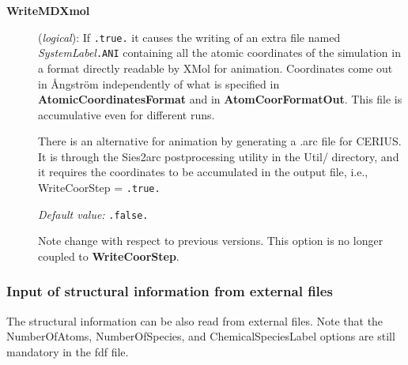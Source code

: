 \documentclass[11pt]{article}
\begin{document}
\begin{itemize}
\begin{description}
\item[{\bf WriteMDXmol}] ({\it logical}):
If {\tt .true.} it causes the writing of an extra file
named {\it SystemLabel}{\tt .ANI} containing all the atomic
coordinates of the simulation in a format directly readable by
{\sc XMol} for animation. Coordinates come out in
{\AA}ngstr\"om independently of what is specified in
{\bf AtomicCoordinatesFormat} and in {\bf AtomCoorFormatOut}.
This file is accumulative even for different runs.

There is an alternative for animation by generating a .arc file for
CERIUS. It is through the {\sc Sies2arc} postprocessing utility in the Util/ directory, and it
requires the coordinates to be accumulated in the output file, i.e.,
WriteCoorStep = {\tt .true.}

{\it Default value:} {\tt .false.}

Note change with respect to previous versions. This option is no
longer coupled to {\bf WriteCoorStep}.

\end{description}

\end{itemize}

\subsubsection{Input of structural information from external files}

The structural information can be also read from external files. Note
that the NumberOfAtoms, NumberOfSpecies, and ChemicalSpeciesLabel
options are still mandatory in the fdf file.
\end{document}
